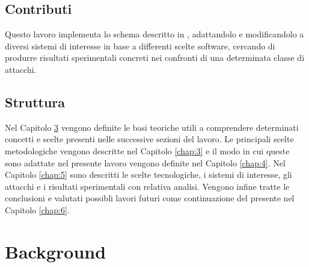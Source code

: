 \documentclass[Lau,binding=0.6cm,noexaminfo]{sapthesis}
\begin{document}
\section{Contributi}
Questo lavoro implementa lo schema descritto in \cite{ahmed2018noise}, adattandolo e modificandolo a diversi sistemi di interesse in base a differenti scelte software, cercando di produrre risultati sperimentali concreti nei confronti di una determinata classe di attacchi. 


\section{Struttura}
Nel Capitolo \ref{chap:2} vengono definite le basi teoriche utili a comprendere determinati concetti e scelte presenti nelle successive sezioni del lavoro.
Le principali scelte metodologiche vengono descritte nel Capitolo \ref{chap:3} e il modo in cui queste sono adattate nel presente lavoro vengono definite nel Capitolo \ref{chap:4}.
Nel Capitolo \ref{chap:5} sono descritti le scelte tecnologiche, i sistemi di interesse, gli attacchi e i risultati sperimentali con relativa analisi.
Vengono infine tratte le conclusioni e valutati possibli lavori futuri come continuazione del presente nel Capitolo \ref{chap:6}.


\chapter{Background}\label{chap:2}
\end{document}
